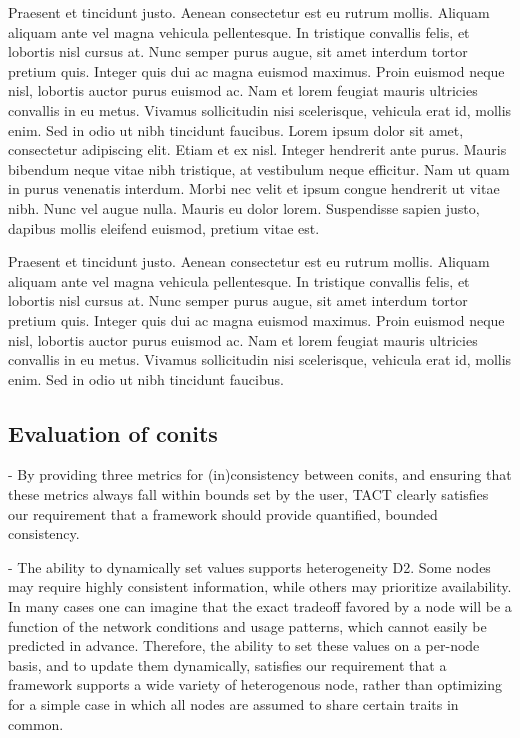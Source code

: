 Praesent et tincidunt justo. Aenean consectetur est eu rutrum
mollis. Aliquam aliquam ante vel magna vehicula pellentesque. In
tristique convallis felis, et lobortis nisl cursus at. Nunc semper
purus augue, sit amet interdum tortor pretium quis. Integer quis dui
ac magna euismod maximus. Proin euismod neque nisl, lobortis auctor
purus euismod ac. Nam et lorem feugiat mauris ultricies convallis in
eu metus. Vivamus sollicitudin nisi scelerisque, vehicula erat id,
mollis enim. Sed in odio ut nibh tincidunt faucibus.  Lorem ipsum
dolor sit amet, consectetur adipiscing elit. Etiam et ex nisl. Integer
hendrerit ante purus. Mauris bibendum neque vitae nibh tristique, at
vestibulum neque efficitur. Nam ut quam in purus venenatis
interdum. Morbi nec velit et ipsum congue hendrerit ut vitae
nibh. Nunc vel augue nulla. Mauris eu dolor lorem. Suspendisse sapien
justo, dapibus mollis eleifend euismod, pretium vitae est.

Praesent et tincidunt justo. Aenean consectetur est eu rutrum
mollis. Aliquam aliquam ante vel magna vehicula pellentesque. In
tristique convallis felis, et lobortis nisl cursus at. Nunc semper
purus augue, sit amet interdum tortor pretium quis. Integer quis dui
ac magna euismod maximus. Proin euismod neque nisl, lobortis auctor
purus euismod ac. Nam et lorem feugiat mauris ultricies convallis in
eu metus. Vivamus sollicitudin nisi scelerisque, vehicula erat id,
mollis enim. Sed in odio ut nibh tincidunt faucibus.

\subsection{Evaluation of conits}

- By providing three metrics for (in)consistency between conits, and
  ensuring that these metrics always fall within bounds set by the
  user, TACT clearly satisfies our requirement that a framework should
  provide quantified, bounded consistency.

- The ability to dynamically set values supports heterogeneity
  D2. Some nodes may require highly consistent information, while
  others may prioritize availability. In many cases one can imagine
  that the exact tradeoff favored by a node will be a function of the
  network conditions and usage patterns, which cannot easily be
  predicted in advance. Therefore, the ability to set these values on
  a per-node basis, and to update them dynamically, satisfies our
  requirement that a framework supports a wide variety of heterogenous
  node, rather than optimizing for a simple case in which all nodes
  are assumed to share certain traits in common.

